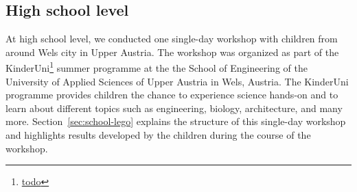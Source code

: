 \documentclass{PDS}
\begin{document}






\subsection{High school level}
\label{sec:school}

At high school level, we conducted one single-day workshop with children from around Wels city in Upper Austria.
The workshop was organized as part of the KinderUni\footnote{\url{todo}} summer programme at the the School of Engineering of the University of Applied Sciences of Upper Austria in Wels, Austria.
The KinderUni programme provides children the chance to experience science hands-on and to learn about different topics such as engineering, biology, architecture, and many more.
Section~\ref{sec:school-lego} explains the structure of this single-day workshop and highlights results developed by the children during the course of the workshop.
\end{document}
